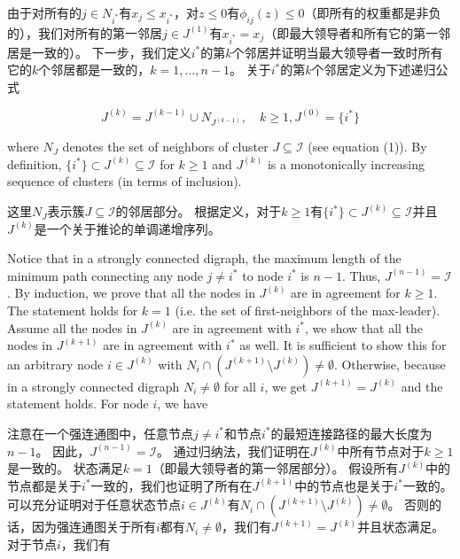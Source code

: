 \documentclass{article}
\begin{document}
\noindent 由于对所有的$j\in N_{i^*}$有$x_j\le x_{i^*}$，对$z\le 0$有$\phi_{ij}(z)\le 0$（即所有的权重都是非负的），我们对所有的第一邻居$j\in J^{(1)}$有$x_{i^*}=x_j$（即最大领导者和所有它的第一邻居是一致的）。
下一步，我们定义$i^*$的第$k$个邻居并证明当最大领导者一致时所有它的$k$个邻居都是一致的，$k = 1,\dots, n − 1$。
关于$i^*$的第$k$个邻居定义为下述递归公式

\begin{equation}
    \tag{46}
    \label{46}
    J^{(k)} = J^{(k-1)} \cup N_{J^{(k-1)}},\quad k\ge 1, J^{(0)}=\{i^*\}
\end{equation}

{\color[gray]{0.5}
\noindent where $N_J$ denotes the set of neighbors of cluster $J\subseteq\mathcal{I}$ (see equation (1)). 
By definition, $\{i^*\}\subset J^{(k)} \subseteq \mathcal{I}$ for $k\ge1$ and $J^{(k)}$ is a monotonically increasing sequence of clusters (in terms of inclusion). 
}

\noindent 这里$N_J$表示簇$J\subseteq\mathcal{I}$的邻居部分。
根据定义，对于$k\ge1$有$\{i^*\}\subset J^{(k)} \subseteq \mathcal{I}$并且$J^{(k)}$是一个关于推论的单调递增序列。

{\color[gray]{0.5}
Notice that in a strongly connected digraph, the maximum length of the minimum path connecting any node $j\ne i^*$ to node $i^*$ is $n-1$. 
Thus, $J^{(n-1)} = \mathcal{I}$. 
By induction, we prove that all the nodes in $J^{(k)}$ are in agreement for $k\ge 1$. 
The statement holds for $k=1$ (i.e. the set of first-neighbors of the max-leader). 
Assume all the nodes in $J^{(k)}$ are in agreement with $i^*$, we show that all the nodes in $J^{(k+1)}$ are in agreement with $i^*$ as well. 
It is sufficient to show this for an arbitrary node $i\in J^{(k)}$ with $N_i \cap (J^{(k+1)}\setminus J^{(k)}) \ne \emptyset$. 
Otherwise, because in a strongly connected digraph $N_i \ne \emptyset$ for all $i$, we get $J^{(k+1)}=J^{(k)}$ and the statement holds. 
For node $i$, we have
}

注意在一个强连通图中，任意节点$j\ne i^*$和节点$i^*$的最短连接路径的最大长度为$n-1$。
因此，$J^{(n-1)} = \mathcal{I}$。
通过归纳法，我们证明在$J^{(k)}$中所有节点对于$k\ge 1$是一致的。
状态满足$k=1$（即最大领导者的第一邻居部分）。
假设所有$J^{(k)}$中的节点都是关于$i^*$一致的，我们也证明了所有在$J^{(k+1)}$中的节点也是关于$i^*$一致的。
可以充分证明对于任意状态节点$i\in J^{(k)}$有$N_i \cap (J^{(k+1)}\setminus J^{(k)}) \ne \emptyset$。
否则的话，因为强连通图关于所有$i$都有$N_i \ne \emptyset$，我们有$J^{(k+1)}=J^{(k)}$并且状态满足。
对于节点$i$，我们有
\end{document}

